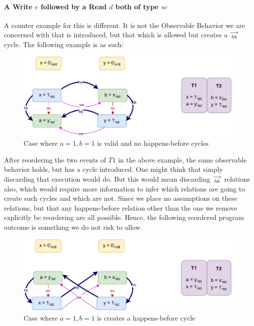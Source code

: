     \paragraph{A Write $e$ followed by a Read $d$ both of type $sc$}
        
        A counter example for this is different. It is not the Observable Behavior we are concerned with that is introduced, but that which is allowed but creates a $\stackrel{\longrightarrow}{_{hb}}$ cycle. The following example is as such:
        \begin{figure}[H]
            \centering
            \includegraphics[scale=0.7]{5.InstructionReordering/4.ValidReorderingCandidate/Example5(Wsc-Rsc).pdf}
            \caption{Case where $a = 1, b = 1$ is valid and no happens-before cycles}
            \label{reord_counter:example3(a)}
        \end{figure}

        After reordering the two events of $T1$ in the above example, the same observable behavior holds, but has a cycle introduced. One might think that simply discarding that execution would do. But this would mean discarding $\stackrel{\longrightarrow}{_{hb}}$ relations also, which would require more information to infer which relations are going to create such cycles and which are not. Since we place no assumptions on these relations, but that any happens-before relation other than the one we remove explicitly be reordering are all possible. Hence, the following reordered program outcome is something we do not risk to allow.

        \begin{figure}[H]
            \centering
            \includegraphics[scale=0.7]{5.InstructionReordering/4.ValidReorderingCandidate/Example5R(Wsc-Rsc).pdf}
            \caption{Case where $a = 1, b = 1$ is creates a happens-before cycle}
            \label{reord_counter:example3(b)}
        \end{figure}

